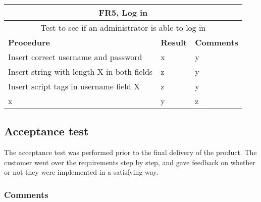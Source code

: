 \begin{table}[ht!]
\begin{tabular}{|m{4cm}|m{2cm}|m{4cm}|}
\hline
\multicolumn{3}{|c|}{\textbf{FR5, Log in}} \\ \hline
\multicolumn{3}{|c|}{{Test to see if an administrator is able to log in}} \\ \hline
\textbf{Procedure} & \textbf{Result} & \textbf{Comments} \\ \hline
Insert correct username and password & x & y \\ \hline
Insert string with length X in both fields &z&y \\ \hline
Insert script tags in username field X &z&y \\ \hline
x&y&z \\ \hline
\end{tabular}
\end{table}

\subsection{Acceptance test}
\label{subsec:testing-test_execution-acceptance_test}

The acceptance test was performed prior to the final delivery of the product. The customer went over the requirements step by step, and gave feedback on whether or not they were implemented in a satisfying way.

\subsubsection{Comments}
\label{subsec:testing-test_execution-acceptance_test-comments}


\clearpage